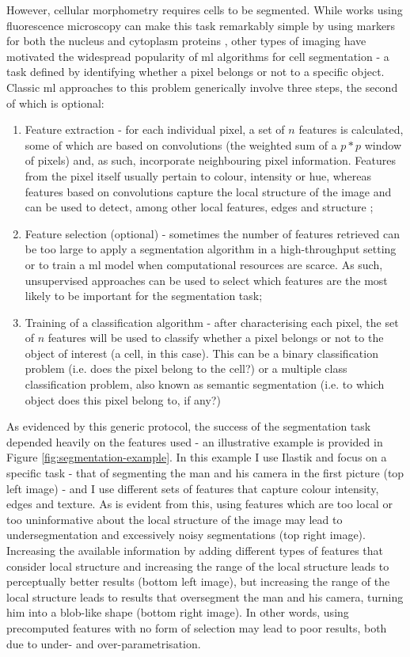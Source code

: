 However, cellular morphometry requires cells to be segmented. While works using fluorescence microscopy can make this task remarkably simple by using markers for both the nucleus and cytoplasm proteins \cite{Fuchs2010-pk,Gustafsdottir2013-ul}, other types of imaging have motivated the widespread popularity of \ac{ml} algorithms for cell segmentation - a task defined by identifying whether a pixel belongs or not to a specific object. Classic \ac{ml} approaches to this problem generically involve three steps, the second of which is optional:

\begin{enumerate}
	\item Feature extraction - for each individual pixel, a set of $n$ features is calculated, some of which are based on convolutions (the weighted sum of a $p*p$ window of pixels) and, as such, incorporate neighbouring pixel information. Features from the pixel itself usually pertain to colour, intensity or hue, whereas features based on convolutions capture the local structure of the image and can be used to detect, among other local features, edges \cite{Canny1986-pi} and structure \cite{Sato1998-sy};
	\item Feature selection (optional) - sometimes the number of features retrieved can be too large to apply a segmentation algorithm in a high-throughput setting or to train a \ac{ml} model when computational resources are scarce. As such, unsupervised approaches can be used to select which features are the most likely to be important for the segmentation task;
	\item Training of a classification algorithm - after characterising each pixel, the set of $n$ features will be used to classify whether a pixel belongs or not to the object of interest (a cell, in this case). This can be a binary classification problem (i.e. does the pixel belong to the cell?) or a multiple class classification problem, also known as semantic segmentation (i.e. to which object does this pixel belong to, if any?)
\end{enumerate}

As evidenced by this generic protocol, the success of the segmentation task depended heavily on the features used -  an illustrative example is provided in Figure \ref{fig:segmentation-example}. In this example I use Ilastik \cite{Sommer2011-ds} and focus on a specific task - that of segmenting the man and his camera in the first picture (top left image) - and I use different sets of features that capture colour intensity, edges and texture. As is evident from this, using features which are too local or too uninformative about the local structure of the image may lead to undersegmentation and excessively noisy segmentations (top right image). Increasing the available information by adding different types of features that consider local structure and increasing the range of the local structure leads to perceptually better results (bottom left image), but increasing the range of the local structure leads to results that oversegment the man and his camera, turning him into a blob-like shape (bottom right image). In other words, using precomputed features with no form of selection may lead to poor results, both due to under- and over-parametrisation. 

